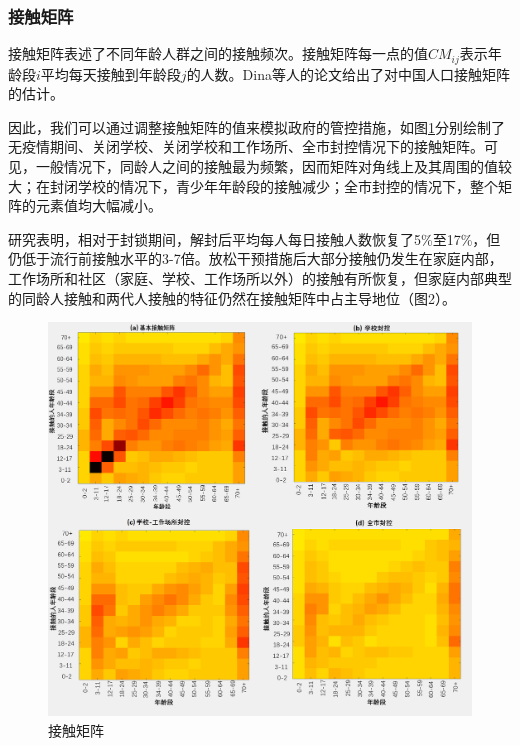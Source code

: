 \documentclass[bwprint]{gmcmthesis}
\numberwithin{figure}{section}
\begin{document}
\subsubsection{接触矩阵}
接触矩阵表述了不同年龄人群之间的接触频次。接触矩阵每一点的值$CM_{ij}$表示年龄段$i$平均每天接触到年龄段$j$的人数。Dina等人的论文\cite{}给出了对中国人口接触矩阵的估计。

\par 因此，我们可以通过调整接触矩阵的值来模拟政府的管控措施，如图\ref{cm}分别绘制了无疫情期间、关闭学校、关闭学校和工作场所、全市封控情况下的接触矩阵。可见，一般情况下，同龄人之间的接触最为频繁，因而矩阵对角线上及其周围的值较大；在封闭学校的情况下，青少年年龄段的接触减少；全市封控的情况下，整个矩阵的元素值均大幅减小。
\par 研究表明，相对于封锁期间，解封后平均每人每日接触人数恢复了5\%至17\%，但仍低于流行前接触水平的3-7倍。放松干预措施后大部分接触仍发生在家庭内部，工作场所和社区（家庭、学校、工作场所以外）的接触有所恢复，但家庭内部典型的同龄人接触和两代人接触的特征仍然在接触矩阵中占主导地位（图2）。
\begin{figure}[!h]
\centering
\includegraphics[width=1\textwidth]{4CM.png}
\caption{接触矩阵}
\label{cm}
\end{figure}
%
%
%
\end{document}
